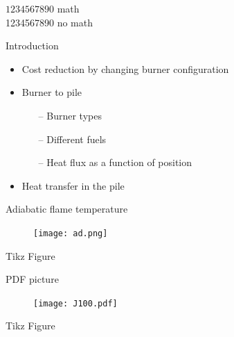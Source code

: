 \documentclass[11pt,aspectratio=43,mathserif]{beamer}
\begin{document}
\begin{frame}
	$1 2 3 4 5 6 7 8 9 0$ math \\
	1234567890 no math
\end{frame}

\begin{frame}{Introduction}
	\begin{itemize}
		\item Cost reduction by changing burner configuration
		\item Burner to pile
		\begin{itemize}
			\item[--] Burner types
			\item[--] Different fuels
			\item[--] Heat flux as a function of position
		\end{itemize}				
		\item Heat transfer in the pile
\end{itemize}
\end{frame}

\begin{frame}{Adiabatic flame temperature}
	\begin{figure}[H]
		\centering 
		\texttt{[image: ad.png]}
	\end{figure} 
\end{frame}

\begin{frame}{Tikz Figure}
\vspace*{-2mm}
	\begin{figure}
		\setlength{}
		\setlength{}
		\centering		
		
		\label{kalsd}
	\end{figure}
\end{frame}

\begin{frame}{PDF picture}
	\begin{figure}[h!]
		\centering 
		\texttt{[image: J100.pdf]}
		\label{fig:}
	\end{figure} 
\end{frame}

\begin{frame}{Tikz Figure}
	\begin{figure}
		\setlength{}
		\setlength{}
		\centering		
		
		\label{kalsd}
	\end{figure}
\end{frame}
\end{document}
